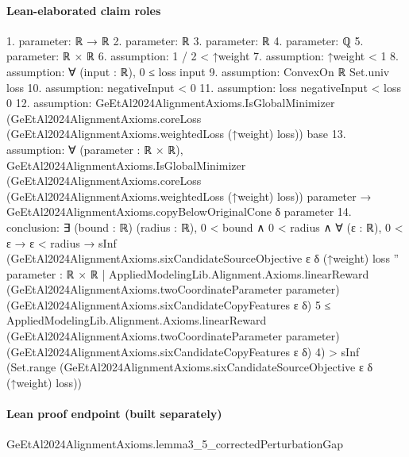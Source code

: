 \documentclass[10pt]{article}
\begin{document}
\paragraph{Lean-elaborated claim roles}\begin{ReviewVerbatim}
1. parameter: ℝ → ℝ
2. parameter: ℝ
3. parameter: ℝ
4. parameter: ℚ
5. parameter: ℝ × ℝ
6. assumption: 1 / 2 < ↑weight
7. assumption: ↑weight < 1
8. assumption: ∀ (input : ℝ), 0 ≤ loss input
9. assumption: ConvexOn ℝ Set.univ loss
10. assumption: negativeInput < 0
11. assumption: loss negativeInput < loss 0
12. assumption: GeEtAl2024AlignmentAxioms.IsGlobalMinimizer
  (GeEtAl2024AlignmentAxioms.coreLoss (GeEtAl2024AlignmentAxioms.weightedLoss (↑weight) loss)) base
13. assumption: ∀ (parameter : ℝ × ℝ),
  GeEtAl2024AlignmentAxioms.IsGlobalMinimizer
      (GeEtAl2024AlignmentAxioms.coreLoss (GeEtAl2024AlignmentAxioms.weightedLoss (↑weight) loss)) parameter →
    GeEtAl2024AlignmentAxioms.copyBelowOriginalCone δ parameter
14. conclusion: ∃ (bound : ℝ) (radius : ℝ),
  0 < bound ∧
    0 < radius ∧
      ∀ (ε : ℝ),
        0 < ε →
          ε < radius →
            sInf
                (GeEtAl2024AlignmentAxioms.sixCandidateSourceObjective ε δ (↑weight) loss ''
                  {parameter : ℝ × ℝ |
                    AppliedModelingLib.Alignment.Axioms.linearReward
                        (GeEtAl2024AlignmentAxioms.twoCoordinateParameter parameter)
                        (GeEtAl2024AlignmentAxioms.sixCandidateCopyFeatures ε δ) 5 ≤
                      AppliedModelingLib.Alignment.Axioms.linearReward
                        (GeEtAl2024AlignmentAxioms.twoCoordinateParameter parameter)
                        (GeEtAl2024AlignmentAxioms.sixCandidateCopyFeatures ε δ) 4}) >
              sInf (Set.range (GeEtAl2024AlignmentAxioms.sixCandidateSourceObjective ε δ (↑weight) loss))
\end{ReviewVerbatim}

\paragraph{Lean proof endpoint (built separately)}\begin{ReviewVerbatim}
GeEtAl2024AlignmentAxioms.lemma3_5_correctedPerturbationGap
\end{ReviewVerbatim}
\end{document}
